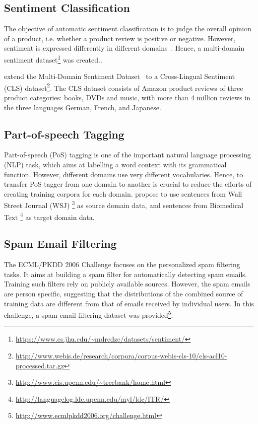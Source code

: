 \documentclass[prodmode]{acmsmall}  %
\begin{document}
\subsection{Sentiment Classification}
The objective of automatic sentiment classification is to judge the overall opinion of a product, i.e. whether a product review is positive or negative. However, sentiment is expressed differently in different domains~\cite{Blitzer2007}. Hence, a multi-domain sentiment dataset\footnote{\url{https://www.cs.jhu.edu/~mdredze/datasets/sentiment/}} was created..

 extend the Multi-Domain Sentiment Dataset~\cite{Blitzer2007} to a Cross-Lingual Sentiment (CLS) dataset\footnote{\url{http://www.webis.de/research/corpora/corpus-webis-cls-10/cls-acl10-processed.tar.gz}}. The CLS dataset consists of Amazon product reviews of three product categories: books, DVDs and music, with more than 4 million reviews in the three languages German, French, and Japanese.
\subsection{Part-of-speech Tagging}
Part-of-speech (PoS) tagging is one of the important natural language processing (NLP) task, which aims at labelling a word context with its grammatical function. However, different domains use very different vocabularies. Hence, to transfer PoS tagger from one domain to another is crucial to reduce the efforts of creating training corpora for each domain.
 propose to use sentences from Wall Street Journal (WSJ) \footnote{\url{http://www.cis.upenn.edu/~treebank/home.html}} as source domain data, and sentences from Biomedical Text \footnote{\url{http://languagelog.ldc.upenn.edu/myl/ldc/ITR/}} as target domain data.
\subsection{Spam Email Filtering}
The ECML/PKDD 2006 Challenge focuses on the personalized spam filtering tasks. It aims at building a spam filter for automatically detecting spam emails. Training such filters rely on publicly available sources. However, the spam emails are person specific, suggesting that the distributions of the combined source of training data are different from that of emails received by individual users. In this challenge, a spam email filtering dataset was provided\footnote{\url{http://www.ecmlpkdd2006.org/challenge.html}}.
\end{document}
